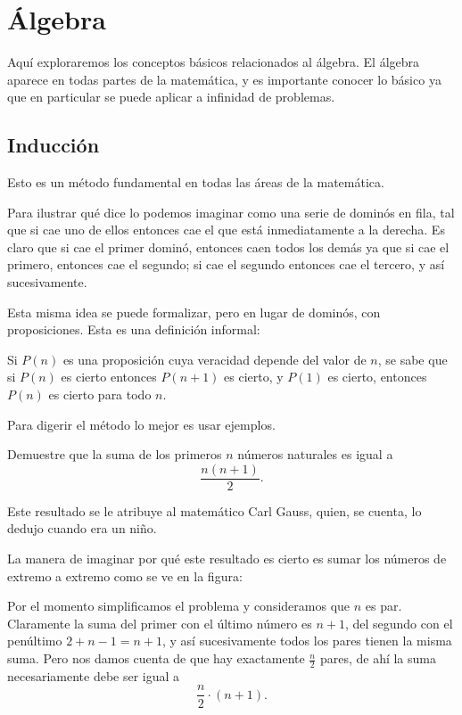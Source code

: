 \chapter{Álgebra}

Aquí exploraremos los conceptos básicos
relacionados al álgebra. El álgebra
aparece en todas partes de la matemática,
y es importante conocer lo básico
ya que en particular se puede aplicar a
infinidad de problemas.

\section{Inducción}
Esto es un método fundamental en todas
las áreas de la matemática.

Para ilustrar qué dice lo podemos imaginar como
una serie de dominós en fila, tal que
si cae uno de ellos entonces cae el que
está inmediatamente a la derecha.
Es claro que si cae el primer dominó, entonces
caen todos los demás ya que si cae el primero,
entonces cae el segundo; si cae el segundo
entonces cae el tercero, y así sucesivamente.


Esta misma idea se puede formalizar, pero
en lugar de dominós, con proposiciones.
Esta es una definición informal:

\begin{theorem}[Inducción]
	\label{theorem:induccion}
	Si $P(n)$ es una proposición cuya veracidad
	depende del valor de $n$, se sabe que si
	$P(n)$ es cierto entonces $P(n + 1)$ es
	cierto, y $P(1)$ es cierto, entonces $P(n)$
	es cierto para todo $n$.
\end{theorem}

Para digerir el método lo mejor es usar
ejemplos.

\begin{example}
	Demuestre que la suma de los primeros
	$n$ números naturales es igual a
	\[\frac{n(n + 1)}2.\]
\end{example}

Este resultado se le atribuye
al matemático Carl Gauss, quien, se cuenta,
lo dedujo cuando era un niño.

La manera de imaginar por qué
este resultado es cierto es sumar
los números de extremo a extremo como se
ve en la figura:

Por el momento simplificamos el problema
y consideramos que $n$ es par. Claramente
la suma del primer con el último
número es $n + 1$,
del segundo con el penúltimo $2 + n - 1 = n + 1$,
y así sucesivamente todos los pares tienen la
misma suma. Pero nos damos cuenta de que
hay exactamente $\frac n2$ pares, de ahí la suma
necesariamente debe ser igual a
\[\frac n2 \cdot (n + 1).\]


